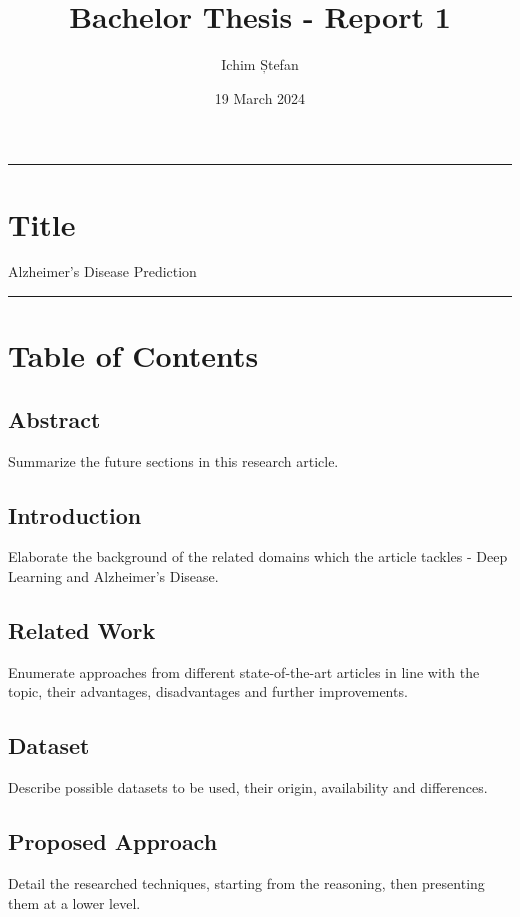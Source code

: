 \documentclass[a4paper]{article} %
\title{Bachelor Thesis - Report 1}
\author{Ichim Ștefan}
\date{19 March 2024}
\begin{document}

\maketitle %

\tableofcontents

\vspace{14pt}
\hrule

\section{Title}
Alzheimer's Disease Prediction

\vspace{14pt}
\hrule
\section{Table of Contents}

\subsection{Abstract}
Summarize the future sections in this research article.

\subsection{Introduction}
Elaborate the background of the related domains which the article tackles - Deep Learning and Alzheimer's Disease.

\subsection{Related Work}
Enumerate approaches from different state-of-the-art articles in line with the topic, their advantages, disadvantages and
further improvements.

\subsection{Dataset}
Describe possible datasets to be used, their origin, availability and differences.

\subsection{Proposed Approach}
Detail the researched techniques, starting from the reasoning, then presenting them at a lower level.
\end{document}
